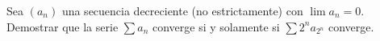 
Sea $(a_n)$ una secuencia decreciente (no estrictamente) con $\lim a_n = 0$.
Demostrar que la serie $\sum a_n$ converge si y solamente si $\sum 2^n a_{2^n}$ converge.